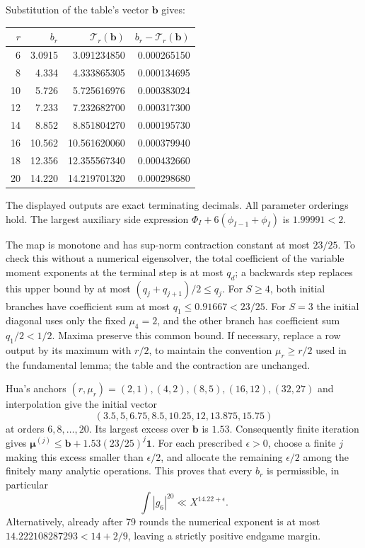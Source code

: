 \documentclass[11pt,reqno]{amsart}
\numberwithin{equation}{section}
\theoremstyle{definition}
\begin{document}
Substitution of the table's vector $\boldsymbol b$ gives:
\begin{center}
\begin{tabular}{@{}r r r r@{}}
\toprule
$r$ & $b_r$ & $\mathcal T_r(\boldsymbol b)$ & $b_r-\mathcal T_r(\boldsymbol b)$\\
\midrule
6 &3.0915&3.091234850&0.000265150\\
8 &4.334&4.333865305&0.000134695\\
10&5.726&5.725616976&0.000383024\\
12&7.233&7.232682700&0.000317300\\
14&8.852&8.851804270&0.000195730\\
16&10.562&10.561620060&0.000379940\\
18&12.356&12.355567340&0.000432660\\
20&14.220&14.219701320&0.000298680\\
\bottomrule
\end{tabular}
\end{center}
The displayed outputs are exact terminating decimals. All parameter orderings
hold. The largest auxiliary side expression
$\Phi_I+6(\phi_{I-1}+\phi_I)$ is $1.99991<2$.

The map is monotone and has sup-norm contraction constant at most $23/25$.
To check this without a numerical eigensolver, the total coefficient of the
variable moment exponents at the terminal step is at most $q_d$; a backwards
step replaces this upper bound by at most $(q_j+q_{j+1})/2\le q_j$.
For $S\ge4$, both initial branches have coefficient sum at most
$q_1\le0.91667<23/25$. For $S=3$ the initial diagonal uses only the fixed
$\mu_4=2$, and the other branch has coefficient sum $q_1/2<1/2$.
Maxima preserve this common bound. If necessary, replace a row output by its
maximum with $r/2$, to maintain the convention $\mu_r\ge r/2$ used in the
fundamental lemma; the table and the contraction are unchanged.

Hua's anchors $(r,\mu_r)=(2,1),(4,2),(8,5),(16,12),(32,27)$ and
interpolation give the initial vector
\[
 (3.5,5,6.75,8.5,10.25,12,13.875,15.75)
\]
at orders $6,8,\ldots,20$. Its largest excess over $\boldsymbol b$ is $1.53$.
Consequently finite iteration gives
$\boldsymbol\mu^{(j)}\le\boldsymbol b+1.53(23/25)^j\mathbf1$.
For each prescribed $\epsilon>0$, choose a finite $j$ making this excess
smaller than $\epsilon/2$, and allocate the remaining $\epsilon/2$ among
the finitely many analytic operations. This proves that every $b_r$ is
permissible, in particular
\[
 \int|g_6|^{20}\ll X^{14.22+\epsilon}.
\]
Alternatively, already after 79 rounds the numerical exponent is at most
$14.222108287293<14+2/9$, leaving a strictly positive endgame margin.
\end{document}
